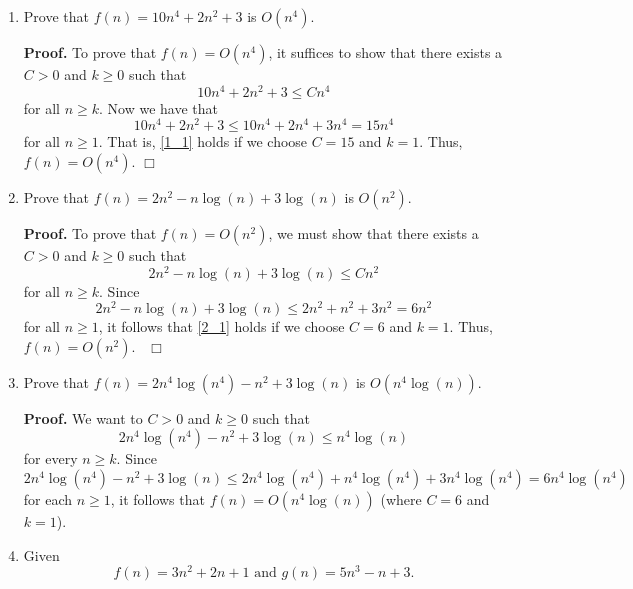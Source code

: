 \documentclass[9pt]{article}
\newcommand{\qed}{\hfill \ensuremath{\Box}}
\begin{document}
\begin{enumerate}
   \item Prove that $f(n) = 10n^4 + 2n^2 + 3$ is $O(n^4)$.

      \textbf{Proof.} To prove that $f(n) = O(n^4)$, it suffices to show that 
      there exists a $C > 0$ and $k \ge 0$ such that
      \begin{equation} \label{1_1}
         10n^4 + 2n^2 + 3 \le Cn^4
      \end{equation}
      for all $n \ge k$. Now we have that
      $$10n^4 + 2n^2 + 3 \le 10n^4 + 2n^4 + 3n^4 = 15n^4$$
      for all $n \ge 1$. That is, \eqref{1_1} holds if we choose $C = 15$ and
      $k = 1$. Thus, $f(n) = O(n^4)$. \qed
   \item Prove that $f(n) = 2n^2 - n\log(n) + 3\log(n)$ is $O(n^2)$.

      \textbf{Proof.} To prove that $f(n) = O(n^2)$, we must show that there
      exists a $C > 0$ and $k \ge 0$ such that
      \begin{equation} \label{2_1}
         2n^2 - n\log(n) + 3\log(n) \le Cn^2
      \end{equation}
      for all $n \ge k$. Since
      $$2n^2 - n\log(n) + 3\log(n) \le 2n^2 + n^2 + 3n^2 = 6n^2$$
      for all $n \ge 1$, it follows that \eqref{2_1} holds if we choose
      $C = 6$ and $k = 1$. Thus, $f(n) = O(n^2)$. \mbox{ }\qed
   \item Prove that $f(n) = 2n^4\log(n^4) - n^2 + 3\log(n)$ is $O(n^4\log(n))$.

      \textbf{Proof.} We want to $C > 0$ and $k \ge 0$ such
      that
      $$2n^4\log(n^4) - n^2 + 3\log(n) \le n^4\log(n)$$
      for every $n \ge k$. Since
      $$2n^4\log(n^4) - n^2 + 3\log(n) \le 2n^4\log(n^4) + n^4\log(n^4) +
        3n^4\log(n^4) = 6n^4\log(n^4)$$
      for each $n \ge 1$, it follows that $f(n) = O(n^4\log(n))$ (where $C = 6$
      and $k = 1$).
   \item Given
         $$f(n) = 3n^2 + 2n + 1 \text{ and } g(n) = 5n^3 - n + 3.$$


\end{enumerate}
\end{document}
